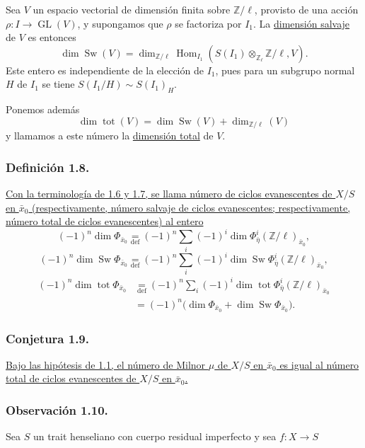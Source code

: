 \pageoriginale

Sea $V$ un espacio vectorial de dimensión finita sobre
$\mathbb Z/\ell$, provisto de una acción
$\rho:I\to\operatorname{GL}(V)$, y supongamos que $\rho$ se factoriza
por $I_1$. La \underline{dimensión salvaje} de $V$ es entonces
\begin{equation}\tag{1.7.1}
\dim\operatorname{Sw}(V)
=\dim_{\mathbb Z/\ell}
\operatorname{Hom}_{I_1}\!\left(
S(I_1)\otimes_{\mathbb Z_\ell}
\mathbb Z/\ell,V\right).
\end{equation}
Este entero es independiente de la elección de $I_1$, pues para un
subgrupo normal $H$ de $I_1$ se tiene $S(I_1/H)\sim S(I_1)_H$.

Ponemos además
\[
\dim\operatorname{tot}(V)
=\dim\operatorname{Sw}(V)+\dim_{\mathbb Z/\ell}(V)
\]
y llamamos a este número la \underline{dimensión total} de $V$.

\subsubsection*{Definición 1.8.}
\underline{Con la terminología de 1.6 y 1.7, se llama número de ciclos
evanescentes de $X/S$ en $\bar x_0$ (respectivamente, número salvaje
de ciclos evanescentes; respectivamente, número total de ciclos
evanescentes) al entero}
\[
(-1)^n\dim\Phi_{\bar x_0}
\underset{\mathrm{def}}{=}
(-1)^n\sum_i(-1)^i
\dim\Phi^i_{\bar\eta}(\mathbb Z/\ell)_{\bar x_0},
\]
\[
(-1)^n\dim\operatorname{Sw}\Phi_{\bar x_0}
\underset{\mathrm{def}}{=}
(-1)^n\sum_i(-1)^i
\dim\operatorname{Sw}
\Phi^i_{\bar\eta}(\mathbb Z/\ell)_{\bar x_0},
\]
\[
\begin{aligned}
(-1)^n\dim\operatorname{tot}\Phi_{\bar x_0}
&\underset{\mathrm{def}}{=}
(-1)^n\sum_i(-1)^i
\dim\operatorname{tot}
\Phi^i_{\bar\eta}(\mathbb Z/\ell)_{\bar x_0}\\
&=(-1)^n\bigl(
\dim\Phi_{\bar x_0}+\dim\operatorname{Sw}\Phi_{\bar x_0}
\bigr).
\end{aligned}
\]

\subsubsection*{Conjetura 1.9.}
\underline{Bajo las hipótesis de 1.1, el número de Milnor $\mu$ de
$X/S$ en $\bar x_0$ es igual al número total de ciclos evanescentes
de $X/S$ en $\bar x_0$.}

\subsubsection*{Observación 1.10.}
Sea $S$ un trait henseliano con cuerpo residual imperfecto y sea
$f:X\to S$

